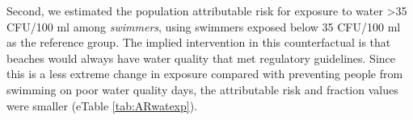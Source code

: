 \documentclass[12pt]{article}\usepackage[]{graphicx}\usepackage[]{color}
\begin{document}
Second, we estimated the population attributable risk for exposure to water >35 CFU/100 ml among \textit{swimmers}, using swimmers exposed below 35 CFU/100 ml as the reference group. The implied intervention in this counterfactual is that beaches would always have water quality that met regulatory guidelines.  Since this is a less extreme change in exposure compared with preventing people from swimming on poor water quality days, the attributable risk and fraction values were smaller (eTable \ref{tab:ARwatexp}). 

\end{document}
